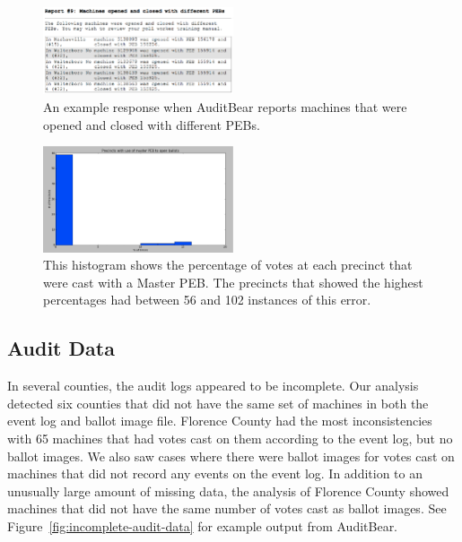 \documentclass[letterpaper,twocolumn,10pt]{article}
\begin{document}
\begin{figure}[htbp]
\begin{center}
    \includegraphics[width=0.5\textwidth,height=0.2\textheight]{OpenClosePEBs.eps}
\end{center}
\caption{An example response when AuditBear reports machines that were opened and closed with different PEBs.}
\label{fig:diff-pebs-open-close}
\end{figure}

\begin{figure}[htbp]
\begin{center}
    \includegraphics[width=0.5\textwidth,height=0.4\textheight]{PEBactivateHist.eps}
\end{center}
\caption{This histogram shows the percentage of votes at each precinct that were 
cast with a Master PEB.  The precincts that showed the highest percentages had 
between 56 and 102 instances of this error.}
\label{fig:master-peb-activated}
\end{figure}

\subsection{Audit Data}
 In several counties, the audit logs appeared to be incomplete. Our analysis
 detected six counties that did not have the same set of machines in both the
 event log and ballot image file. Florence County had the most inconsistencies
 with 65 machines that had votes cast on them according to the event log, but no
 ballot images. We also saw cases where there were ballot images for votes cast
 on machines that did not record any events on the event log. In addition to an
 unusually large amount of missing data, the analysis of Florence County showed
 machines that did not have the same number of votes cast as ballot images. See
 Figure~\ref{fig:incomplete-audit-data} for example output from AuditBear. 
\end{document}
